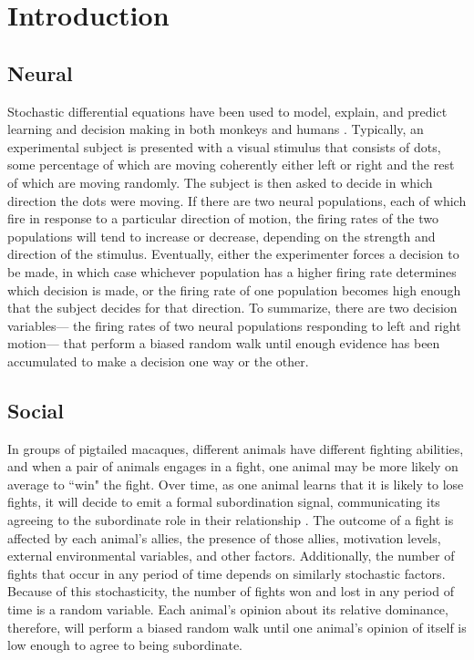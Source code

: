 \documentclass{article}
\begin{document}
\section{Introduction}

\subsection{Neural }
Stochastic differential equations have been used to model, explain, and predict learning and decision making in both monkeys and humans \citep{Eckhoff:2008uq, Brown:2005fk,Feng:2009kl,Bogacz:2006uq}.  Typically, an experimental subject is presented with a visual stimulus that consists of dots, some percentage of which are moving coherently either left or right and the rest of which are moving randomly.  The subject is then asked to decide in which direction the dots were moving.  If there are two neural populations, each of which fire in response to a particular direction of motion, the firing rates of the two populations will tend to increase or decrease, depending on the strength and direction of the stimulus.  Eventually, either the experimenter forces a decision to be made, in which case whichever population has a higher firing rate determines which decision is made, or the firing rate of one population becomes high enough that the subject decides for that direction.  To summarize, there are two decision variables--- the firing rates of two neural populations responding to left and right motion--- that perform a biased random walk until enough evidence has been accumulated to make a decision one way or the other.


\subsection{Social }
In groups of pigtailed macaques, different animals have different fighting abilities, and when a pair of animals engages in a fight, one animal may be more likely on average to ``win" the fight.  Over time, as one animal learns that it is likely to lose fights, it will decide to emit a formal subordination signal, communicating its agreeing to the subordinate role in their relationship \citep{Flack:2007kx, Flack:2006fk,Flack:2004oq, Waal:1985fk,Caldecott:1986uk}.  The outcome of a fight is affected by each animal's allies, the presence of those allies, motivation levels,  external environmental variables, and other factors.  Additionally, the number of fights that occur in any period of time depends on similarly stochastic factors.  Because of this stochasticity, the number of fights won and lost in any period of time is a random variable.  Each animal's opinion about its relative dominance, therefore, will perform a biased random walk until one animal's opinion of itself is low enough to agree to being subordinate.
\end{document}
